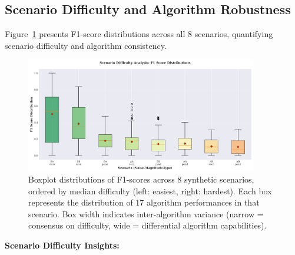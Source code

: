 \subsection{Scenario Difficulty and Algorithm Robustness}

Figure~\ref{fig:scenario_difficulty} presents F1-score distributions across all 8 scenarios, quantifying scenario difficulty and algorithm consistency.

\begin{figure}[H]
\centering
\includegraphics[width=0.90\textwidth]{figures/fig_scenario_difficulty.png}
\caption{Boxplot distributions of F1-scores across 8 synthetic scenarios, ordered by median difficulty (left: easiest, right: hardest). Each box represents the distribution of 17 algorithm performances in that scenario. Box width indicates inter-algorithm variance (narrow = consensus on difficulty, wide = differential algorithm capabilities).}
\label{fig:scenario_difficulty}
\end{figure}

\textbf{Scenario Difficulty Insights:}

